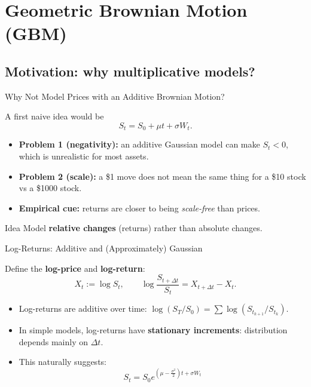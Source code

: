 \documentclass[10pt,aspectratio=169]{beamer}
\begin{document}
\section{Geometric Brownian Motion (GBM)}

\subsection{Motivation: why multiplicative models?}

\begin{frame}{Why Not Model Prices with an Additive Brownian Motion?}

A first naive idea would be
\[
S_t = S_0 + \mu t + \sigma W_t.
\]\pause

\begin{itemize}
  \item \textbf{Problem 1 (negativity):}\pause\;
  an additive Gaussian model can make \(S_t<0\), which is unrealistic for most assets.\pause
  \item \textbf{Problem 2 (scale):}\pause\;
  a \$1 move does not mean the same thing for a \$10 stock vs a \$1000 stock.\pause
  \item \textbf{Empirical cue:}\pause\;
  returns are closer to being \emph{scale-free} than prices.
\end{itemize}

\medskip
\begin{block}{Idea}
Model \textbf{relative changes} (returns) rather than absolute changes.
\end{block}

\end{frame}

\begin{frame}{Log-Returns: Additive and (Approximately) Gaussian}

Define the \textbf{log-price} and \textbf{log-return}:
\[
X_t := \log S_t,
\qquad
\log\frac{S_{t+\Delta t}}{S_t} = X_{t+\Delta t}-X_t.
\]\pause

\begin{itemize}
  \item Log-returns are additive over time: \(\log(S_T/S_0)=\sum \log(S_{t_{k+1}}/S_{t_k})\).\pause
  \item In simple models, log-returns have \textbf{stationary increments}:\pause\;
  distribution depends mainly on \(\Delta t\).\pause
  \item This naturally suggests:
  \[
  S_t = S_0 e^{ (\mu - \frac{\sigma^2}{2})t + \sigma W_t}
  \]
\end{itemize}

\end{frame}
\end{document}
